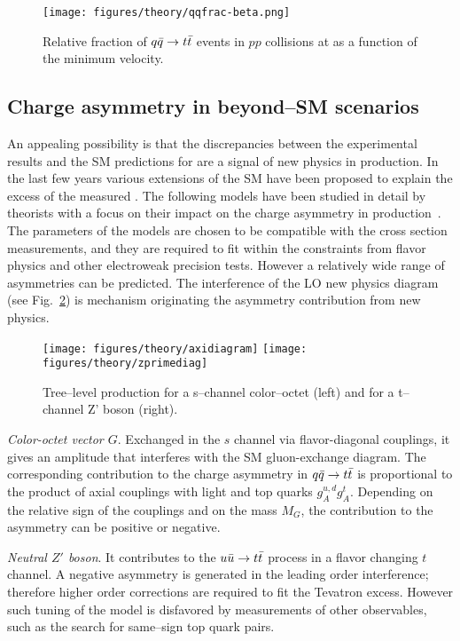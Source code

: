 \begin{figure}[!htb]
  \centering
  \texttt{[image: figures/theory/qqfrac-beta.png]} 
  \caption{Relative fraction of $q\bar{q}{}\to t\bar{t}{}$ events in $pp$
    collisions at \seventev{} as a function of the minimum \ttbar{} velocity.} 
  \label{fig:qqbarfrac}
\end{figure}

\subsection{Charge asymmetry in beyond--SM scenarios}
\label{sec:bsmca}

An appealing possibility is that the discrepancies between the
experimental results and the SM predictions for \afb{} are a signal of
new physics in \ttbar{} production. In the last few years various
extensions of the SM have been proposed to explain the excess of the
measured \afb{}. The following models have been studied in
detail by theorists with a focus on their impact on the charge
asymmetry in \ttbar{} production~\cite{Aguilar-Saavedra:2014kpa}. The
parameters of the models are chosen to be compatible with the \ttbar{}
cross section measurements, and they are required to fit within the
constraints from flavor physics and other electroweak precision
tests. However a relatively wide range of asymmetries can be
predicted. The interference of the LO new physics diagram (see
Fig.~\ref{fig:npdiag}) is mechanism originating the asymmetry
contribution from new physics.

\begin{figure}[!htb]
  \centering
  \texttt{[image: figures/theory/axidiagram]} 
  \texttt{[image: figures/theory/zprimediag]} 
  \caption{Tree--level \ttbar{} production for a s--channel
    color--octet (left) and for a t--channel Z' boson (right).} 
  \label{fig:npdiag}
\end{figure}

{\em Color-octet vector $G$}. Exchanged in the $s$ channel via
flavor-diagonal couplings, it gives 
an amplitude that interferes with the SM gluon-exchange diagram. The
corresponding contribution to the charge asymmetry in
\mbox{$q\bar{q}{}\to t\bar{t}{}$} is proportional to the product of axial
couplings with light and top quarks $g_A^{u,d}g_A^t$. Depending on the
relative sign of the couplings and on the mass $M_G$, the contribution
to the asymmetry can be positive or negative. 

{\em Neutral $Z'$ boson}. It contributes to the $u\bar{u}{}\to t\bar{t}{}$
process in a flavor changing $t$ channel. A negative asymmetry
is generated in the leading order interference; therefore higher order
corrections are required to fit the Tevatron excess. However such
tuning of the model is disfavored by measurements of other
observables, such as the search for same--sign top quark pairs.

